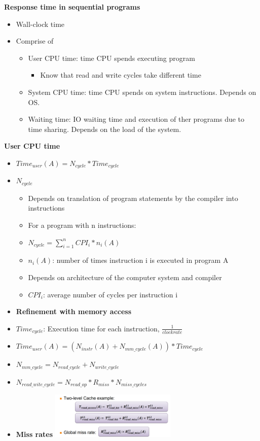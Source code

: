 \documentclass[10pt, landscape]{article}
\begin{document}
\begin{multicols}{4}
\textbf{Response time in sequential programs}
\begin{itemize}
    \item Wall-clock time 
    \item Comprise of 
    \begin{itemize}
        \item User CPU time: time CPU spends executing program 
        \begin{itemize}
            \item Know that read and write cycles take different time 
        \end{itemize}
        \item System CPU time: time CPU spends on system instructions. Depends on OS.
        \item Waiting time: IO waiting time and execution of ther programs due to time sharing. Depends on the load of the system.
    \end{itemize}
\end{itemize}

\textbf{User CPU time}
\begin{itemize}
    \item \textbf{$Time_{user}(A)=N_{cycle} * Time_{cycle}$}
    \item $N_{cycle}$
    \begin{itemize}
        \item Depends on translation of program statements by the compiler into instructions
        \item For a program with n instructions:
        \item $N_{cycle} = \sum_{i=1}^{n} CPI_i * n_i(A)$
        \item $n_i(A)$: number of times instruction i is executed in program A
        \item Depends on architecture of the computer system  and compiler
        \item $CPI_i$: average number of cycles per instruction i
    \end{itemize}  
    \item \textbf{Refinement with memory access}
    \item $Time_{cycle}$: Execution time for each instruction, $\frac{1}{clock rate}$
    \item  $Time_{user}(A)=(N_{instr}(A) + N_{mm\_cycle}(A)) * Time_{cycle}$
    \item $N_{mm\_cycle}=N_{read\_cycle} + N_{write\_cycle}$
    \item $N_{read\_wite\_cycle}=N_{read\_ op}*R_{miss}*N_{miss\_cycles}$
    \item \textbf{Miss rates}
    \includegraphics*[width=6cm]{miss_rate}
\end{itemize}



\end{multicols}
\end{document}
